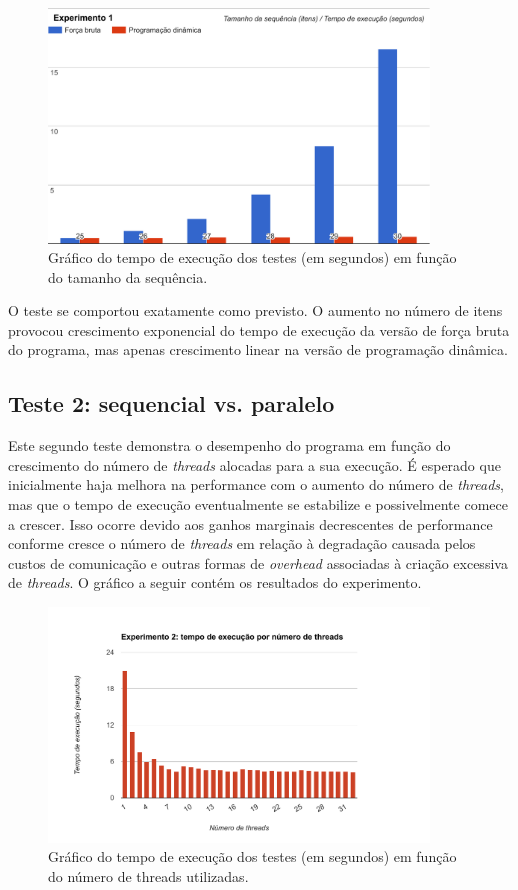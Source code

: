 \documentclass[10pt,a4paper]{article}
\numberwithin{equation}{section}
\begin{document}
\begin{figure}[H]
    \centering
    \includegraphics[width=0.90\textwidth]{graphics/exp1_bf.pdf}
    \caption{Gráfico do tempo de execução dos testes (em segundos) em função do tamanho da sequência.}
    \label{fig:experimento1}
\end{figure}

O teste se comportou exatamente como previsto. O aumento no número de itens provocou crescimento exponencial do tempo de execução da versão de força bruta do programa, mas apenas crescimento linear na versão de programação dinâmica.

\subsection{Teste 2: sequencial vs. paralelo}

Este segundo teste demonstra o desempenho do programa em função do crescimento do número de \emph{threads} alocadas para a sua execução. É esperado que inicialmente haja melhora na performance com o aumento do número de \emph{threads}, mas que o tempo de execução eventualmente se estabilize e possivelmente comece a crescer. Isso ocorre devido aos ganhos marginais decrescentes de performance conforme cresce o número de \emph{threads} em relação à degradação causada pelos custos de comunicação e outras formas de \emph{overhead} associadas à criação excessiva de \emph{threads}. O gráfico a seguir contém os resultados do experimento.

\begin{figure}[H]
    \centering
    \includegraphics[width=0.90\textwidth]{graphics/exp2.pdf}
    \caption{Gráfico do tempo de execução dos testes (em segundos) em função do número de threads utilizadas.}
    \label{fig:experimento2}
\end{figure}
\end{document}

